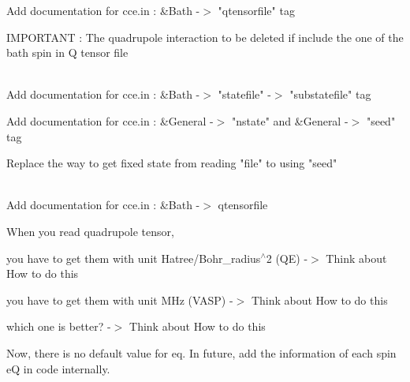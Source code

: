 \begin{DoxyRefList}
\label{todo__todo000010}%
%
Add documentation for cce.\+in \+: \&Bath -\/\texorpdfstring{$>$}{>} "{}qtensorfile"{} tag 



IMPORTANT \+: The quadrupole interaction to be deleted if  include the one of the bath spin in Q tensor file  
\item[Member \doxylink{structBathSpin_a6348f965fe820b03094f4c620ab7ffe0}{Bath\+Spin\+::state} ]\hfill \\
\label{todo__todo000005}%
%
Add documentation for cce.\+in \+: \&Bath -\/\texorpdfstring{$>$}{>} "{}statefile"{} -\/\texorpdfstring{$>$}{>} "{}substatefile"{} tag 



Add documentation for cce.\+in \+: \&General -\/\texorpdfstring{$>$}{>} "{}nstate"{} and \&General -\/\texorpdfstring{$>$}{>} "{}seed"{} tag 



Replace the way to get fixed state from reading "{}file"{} to using "{}seed"{}  
\item[Member \doxylink{structBathSpin_ae88f65d01b379916181269efa6c33e8a}{Bath\+Spin\+::xyz} \mbox{[}3\mbox{]}]\hfill \\
\label{todo__todo000003}%
%
Add documentation for cce.\+in \+: \&Bath -\/\texorpdfstring{$>$}{>} qtensorfile 



When you read quadrupole tensor,
\begin{DoxyItemize}
\item you have to get them with unit Hatree/\+Bohr\+\_\+radius\texorpdfstring{$^\wedge$}{\string^}2 (QE) -\/\texorpdfstring{$>$}{>} Think about How to do this
\item you have to get them with unit MHz (VASP) -\/\texorpdfstring{$>$}{>} Think about How to do this
\item which one is better? -\/\texorpdfstring{$>$}{>} Think about How to do this 
\end{DoxyItemize}



Now, there is no default value for eq. In future, add the information of each spin\textquotesingle{} eQ in code internally. 


\end{DoxyRefList}
